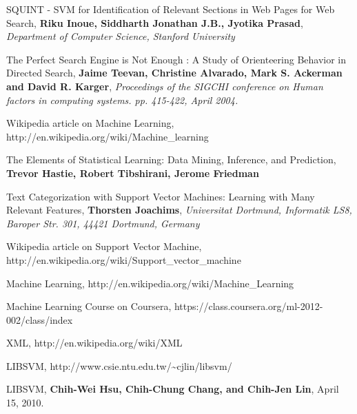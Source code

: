 \documentclass[10pt,a4paper]{report}
\begin{document}
\clearpage
{}
\begin{thebibliography}{99}

 SQUINT - SVM for Identification of Relevant Sections in Web Pages for Web Search, \textbf{Riku Inoue, Siddharth Jonathan J.B., Jyotika Prasad}, \textit{Department of Computer Science, Stanford University}

 The Perfect Search Engine is Not Enough : A Study of Orienteering Behavior in Directed Search, \textbf{Jaime Teevan, Christine Alvarado, Mark S. Ackerman and David R. Karger}, \textit{Proceedings of the SIGCHI conference on Human factors in computing systems. pp. 415-422, April 2004.}

 Wikipedia article on Machine Learning, http://en.wikipedia.org/wiki/Machine\_learning

 The Elements of Statistical Learning: Data Mining, Inference, and Prediction, \textbf{Trevor Hastie, Robert Tibshirani, Jerome Friedman}

 Text Categorization with Support Vector Machines: Learning with Many Relevant Features, \textbf{Thorsten Joachims}, \textit{Universitat Dortmund, Informatik LS8, Baroper Str. 301, 44421 Dortmund, Germany}

 Wikipedia article on Support Vector Machine, http://en.wikipedia.org/wiki/Support\_vector\_machine

 Machine Learning, http://en.wikipedia.org/wiki/Machine\_Learning

 Machine Learning Course on Coursera, https://class.coursera.org/ml-2012-002/class/index

 XML, http://en.wikipedia.org/wiki/XML

 LIBSVM, http://www.csie.ntu.edu.tw/\textasciitilde cjlin/libsvm/ 

 LIBSVM, \textbf{Chih-Wei Hsu, Chih-Chung Chang, and Chih-Jen Lin}, April 15, 2010.

\end{thebibliography}

\end{document}
